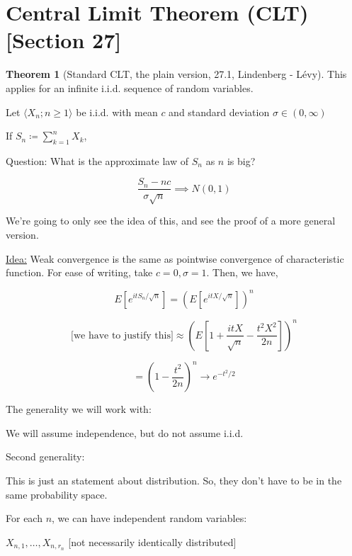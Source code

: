 \documentclass{article}
\theoremstyle{definition}
\newtheorem{theorem}{Theorem}
\begin{document}
\section*{Central Limit Theorem (CLT) [Section 27]}

\begin{theorem}
    [Standard CLT, the plain version, 27.1, Lindenberg - L\'evy]

    This applies for an infinite i.i.d. sequence of random variables.

    Let \(\langle X_n;n\geq 1 \rangle\) be i.i.d. with mean \(c\) and standard deviation \(\sigma \in (0,\infty)\)

    If \(S_n \coloneqq \sum_{k=1}^{n} X_k\),

    Question: What is the approximate law of \(S_n\) as \(n\) is big?

    \[
        \frac{S_n - nc}{\sigma \sqrt{n} } \implies N(0,1)
    \]

\end{theorem}

We're going to only see the idea of this, and see the proof of a more general version.

\underline{Idea:} Weak convergence is the same as pointwise convergence of characteristic function. For ease of writing, take \(c=0,\sigma =1\). Then, we have,

\[
    E[e^{itS_n / \sqrt{n}}] = (E[e^{itX / \sqrt{n} }])^n
\]

\[
    \text{[we have to justify this]}\approx \left( E \left[ 1 + \frac{itX}{\sqrt{n}} - \frac{t^2 X^2}{2n} \right]  \right)^n 
\]

\[
    = \left( 1 - \frac{t^2}{2n} \right) ^n \to e^{-t^2 / 2}
\]

The generality we will work with:

We will assume independence, but do not assume i.i.d.

Second generality:

This is just an statement about distribution. So, they don't have to be in the same probability space.

For each \(n\), we can have independent random variables:

\(X_{n,1},\dots ,X_{n,r_n}\) [not necessarily identically distributed]
\end{document}
